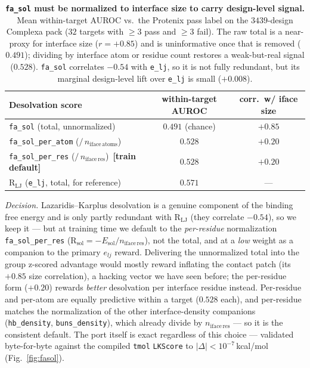 \documentclass[11pt]{article}
\newcommand{\R}{\mathrm{R}}
\newcommand{\ttk}[1]{\texttt{\small #1}}
\begin{document}
\begin{table}[htbp]
\centering\small
\begin{tabular}{lcc}
\toprule
\textbf{Desolvation score} & \textbf{within-target AUROC} & \textbf{corr.\ w/ iface size}\\
\midrule
\ttk{fa\_sol} (total, unnormalized)      & $0.491$ (chance) & $+0.85$\\
\ttk{fa\_sol\_per\_atom} ($/\,n_{\mathrm{iface\,atoms}}$) & $0.528$ & $+0.20$\\
\rowcolor{aTint}\ttk{fa\_sol\_per\_res} ($/\,n_{\mathrm{iface\,res}}$)\ \textbf{[train default]}  & $0.528$ & $+0.20$\\
\midrule
$\R_{\mathrm{LJ}}$ (\ttk{e\_lj}, total, for reference)  & $0.571$ & ---\\
\bottomrule
\end{tabular}
\caption{\textbf{\ttk{fa\_sol} must be normalized to interface size to carry design-level signal.}
Mean within-target AUROC vs.\ the Protenix pass label on the $3439$-design Complexa pack ($32$
targets with $\ge3$ pass and $\ge3$ fail). The raw total is a near-proxy for interface size
($r{=}+0.85$) and is uninformative once that is removed ($0.491$); dividing by interface atom or
residue count restores a weak-but-real signal ($0.528$). \ttk{fa\_sol} correlates $-0.54$ with
\ttk{e\_lj}, so it is not fully redundant, but its marginal design-level lift over \ttk{e\_lj} is
small ($+0.008$).}
\label{tab:fasolnorm}
\end{table}

\emph{Decision.} Lazaridis--Karplus desolvation is a genuine component of the binding free energy
and is only partly redundant with $\R_{\mathrm{LJ}}$ (they correlate $-0.54$), so we keep it --- but
at training time we default to the \emph{per-residue} normalization \ttk{fa\_sol\_per\_res}
($\R_{\mathrm{sol}}=-E_{\mathrm{sol}}/n_{\mathrm{iface\,res}}$), not the total, and at a \emph{low}
weight as a companion to the primary $e_{lj}$ reward. Delivering the unnormalized total into the group
z-scored advantage would mostly reward inflating the contact patch (its $+0.85$ size correlation),
a hacking vector we have seen before; the per-residue form ($+0.20$) rewards \emph{better} desolvation
per interface residue instead. Per-residue and per-atom are equally predictive within a target
($0.528$ each), and per-residue matches the normalization of the other interface-density companions
(\ttk{hb\_density}, \ttk{buns\_density}), which already divide by $n_{\mathrm{iface\,res}}$ --- so it
is the consistent default. The port itself is exact regardless of this choice --- validated byte-for-byte
against the compiled \ttk{tmol} \ttk{LKScore} to $|\Delta|<10^{-7}$\,kcal/mol (Fig.\ \ref{fig:fasol}).
\end{document}
